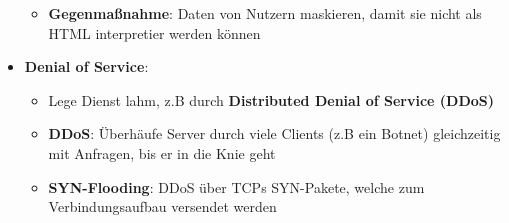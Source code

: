 \begin{itemize}
\begin{itemize}
		\item \textbf{Gegenmaßnahme}: Daten von Nutzern maskieren, damit sie nicht als HTML interpretier werden können
	\end{itemize}
	\item \textbf{Denial of Service}:
	\begin{itemize}
		\item Lege Dienst lahm, z.B durch \textbf{Distributed Denial of Service (DDoS)}
		\item \textbf{DDoS}: Überhäufe Server durch viele Clients (z.B ein Botnet) gleichzeitig mit Anfragen, bis er in die Knie geht
		\item \textbf{SYN-Flooding}: DDoS über TCPs SYN-Pakete, welche zum Verbindungsaufbau versendet werden
	\end{itemize}
\end{itemize}
